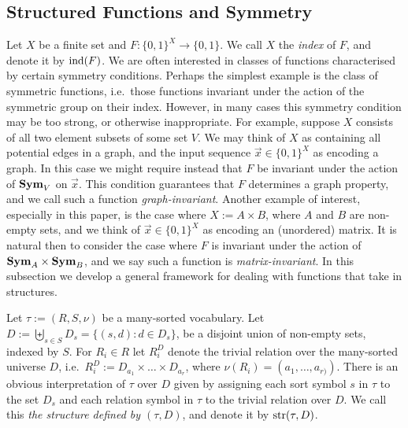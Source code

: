 \documentclass[../paper.tex]{subfiles}
\begin{document}


\subsection{Structured Functions and Symmetry}
Let $X$ be a finite set and $F: \{0,1\}^{X} \rightarrow \{0,1\}$. We call $X$
the \emph{index} of $F$, and denote it by $\text{\upshape ind}(F)$. We are often interested in
classes of functions characterised by certain symmetry conditions. Perhaps the
simplest example is the class of symmetric functions, i.e.\ those functions
invariant under the action of the symmetric group on their index. However, in
many cases this symmetry condition may be too strong, or otherwise
inappropriate. For example, suppose $X$ consists of all two element subsets of
some set $V$. We may think of $X$ as containing all potential edges in a graph,
and the input sequence $ \vec{x} \in \{0,1\}^X$ as encoding a graph. In this
case we might require instead that $F$ be invariant under the action of $\text{\textbf{Sym}}_V$
on $\vec{x}$. This condition guarantees that $F$ determines a graph property,
and we call such a function \emph{graph-invariant}. Another example of interest,
especially in this paper, is the case where $X := A \times B$, where $A$ and $B$
are non-empty sets, and we think of $\vec{x} \in \{0,1\}^X$ as encoding an
(unordered) matrix. It is natural then to consider the case where $F$ is
invariant under the action of $\text{\textbf{Sym}}_A \times \text{\textbf{Sym}}_B$, and we say such a function
is \emph{matrix-invariant}. In this subsection we develop a general framework
for dealing with functions that take in structures.

Let $\tau := (R, S, \nu)$ be a many-sorted vocabulary. Let $D := \biguplus_{s
  \in S} D_{s} = \{(s,d) : d \in D_s\}$, be a disjoint union of non-empty sets,
indexed by $S$. For $R_i \in R$ let $R^D_i$ denote the trivial relation over the
many-sorted universe $D$, i.e.\ $R^D_i := D_{a_1} \times \ldots \times
D_{a_{r}}$, where $\nu(R_i) = (a_1, \ldots , a_{r)})$. There is an obvious
interpretation of $\tau$ over $D$ given by assigning each sort symbol $s$ in
$\tau$ to the set $D_s$ and each relation symbol in $\tau$ to the trivial
relation over $D$. We call this \emph{the structure defined by $(\tau, D)$}, and
denote it by $\text{str}(\tau, D)$.
\end{document}
